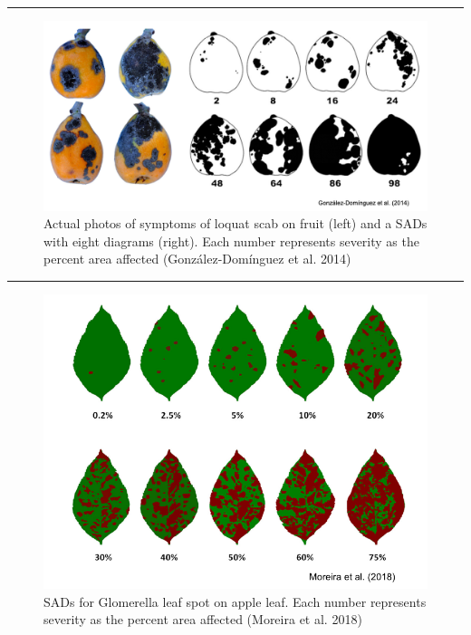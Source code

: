 \documentclass[
  letterpaper,
  DIV=11,
  numbers=noendperiod]{scrreprt}
\begin{document}
\begin{center}\rule{0.5\linewidth}{0.5pt}\end{center}

\begin{figure}

{\centering \includegraphics[width=6.51042in,height=\textheight]{imgs/sad-loquat.png}

}

\caption{\label{fig-sad-loquat}Actual photos of symptoms of loquat scab
on fruit (left) and a SADs with eight diagrams (right). Each number
represents severity as the percent area affected (González-Domínguez et
al. 2014)}

\end{figure}

\begin{center}\rule{0.5\linewidth}{0.5pt}\end{center}

\begin{figure}

{\centering \includegraphics[width=6.47917in,height=\textheight]{imgs/sad-apple.png}

}

\caption{\label{fig-sad-apple}SADs for Glomerella leaf spot on apple
leaf. Each number represents severity as the percent area affected
(Moreira et al. 2018)}

\end{figure}
\end{document}
